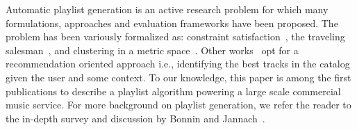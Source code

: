 






%
%

Automatic playlist generation is an active research problem for which many formulations, approaches and evaluation frameworks have been proposed. 
The problem has been variously formalized as:  constraint satisfaction~\cite{Pauws2008647}, the traveling salesman~\cite{Knees:2006}, and clustering in a metric space~\cite{Pauws:ISMIR02}. Other works~\cite{Hariri:2012, Jannach:2015,a2mf} opt for a recommendation oriented approach i.e., identifying the best tracks in the catalog given the user and some context.
To our knowledge, this paper is among the first publications to describe a playlist algorithm powering a large scale commercial music service. For more background on playlist generation, we refer the reader to the in-depth survey and discussion by Bonnin and Jannach~\cite{playlist_survey}.



